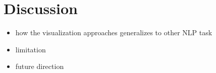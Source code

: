 \section{Discussion}

\begin{itemize}
    \item how the visualization approaches generalizes to other NLP task
    \item limitation
    \item future direction
\end{itemize}
